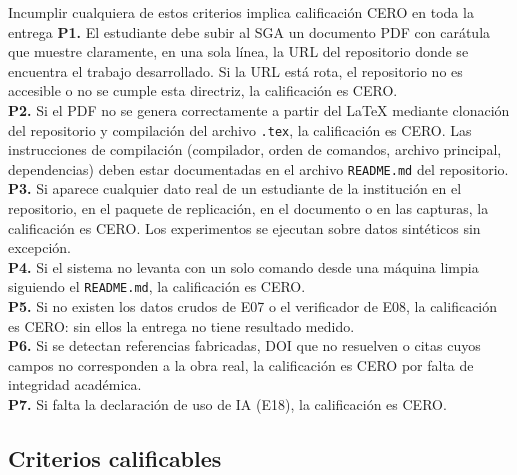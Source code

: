 \documentclass[11pt,a4paper]{article}
\begin{document}
\begin{alerta}{Incumplir cualquiera de estos criterios implica calificación CERO en toda la entrega}
	\textbf{P1.} El estudiante debe subir al SGA un documento PDF con carátula que muestre claramente, en una sola línea, la URL del repositorio donde se encuentra el trabajo desarrollado. Si la URL está rota, el repositorio no es accesible o no se cumple esta directriz, la calificación es CERO.\\[6pt]
	\textbf{P2.} Si el PDF no se genera correctamente a partir del LaTeX mediante clonación del repositorio y compilación del archivo \texttt{.tex}, la calificación es CERO. Las instrucciones de compilación (compilador, orden de comandos, archivo principal, dependencias) deben estar documentadas en el archivo \texttt{README.md} del repositorio.\\[6pt]
	\textbf{P3.} Si aparece cualquier dato real de un estudiante de la institución en el repositorio, en el paquete de replicación, en el documento o en las capturas, la calificación es CERO. Los experimentos se ejecutan sobre datos sintéticos sin excepción.\\[6pt]
	\textbf{P4.} Si el sistema no levanta con un solo comando desde una máquina limpia siguiendo el \texttt{README.md}, la calificación es CERO.\\[6pt]
	\textbf{P5.} Si no existen los datos crudos de E07 o el verificador de E08, la calificación es CERO: sin ellos la entrega no tiene resultado medido.\\[6pt]
	\textbf{P6.} Si se detectan referencias fabricadas, DOI que no resuelven o citas cuyos campos no corresponden a la obra real, la calificación es CERO por falta de integridad académica.\\[6pt]
	\textbf{P7.} Si falta la declaración de uso de IA (E18), la calificación es CERO.
\end{alerta}

\subsection{Criterios calificables}
\end{document}

